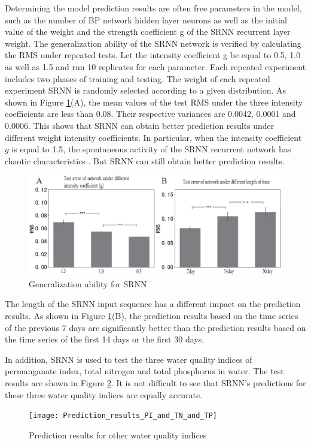 \documentclass[runningheads]{llncs}
\begin{document}
Determining the model prediction results are often free parameters in the model, 
such as the number of BP network hidden layer neurons as well as the initial
value of the weight and the strength coefficient g of the SRNN recurrent 
layer weight. The generalization ability of the SRNN network is verified
by calculating the RMS under repeated tests. 
Let the intensity coefficient g be equal to 0.5, 1.0 as well as 1.5 and run 10 
replicates for each parameter. Each repeated experiment includes two
phases of training and testing. The weight of each repeated experiment 
SRNN is randomly selected according to a given distribution. 
As shown in Figure \ref{Generalization ability for SRNN}(A), the mean values of the test
RMS under the three intensity coefficients are less 
than 0.08. Their respective variances are 0.0042, 0.0001 and 0.0006. This 
shows that SRNN can obtain better prediction results under different weight
intensity coefficients. In particular, when the intensity coefficient
$g$ is equal to 1.5, the spontaneous activity of the SRNN recurrent network has
chaotic characteristics \cite{RN17}. But SRNN can still obtain better prediction results.

\begin{figure}[htbp]
\centering
\includegraphics[width=0.8\columnwidth]{Generalization_for_SRNN}
\caption{Generalization ability for SRNN}
\label{Generalization ability for SRNN}
\end{figure}

The length of the SRNN input sequence has a different impact on the prediction results. 
As shown in Figure \ref{Generalization ability for SRNN}(B), the prediction 
results based on the time series of the 
previous 7 days are significantly better than the prediction results 
based on the time series of the first 14 days or the first 30 days.

In addition, SRNN is used to test the three water quality indices of 
permanganate index, total nitrogen and total phosphorus in water. 
The test results are shown in Figure \ref{Prediction results for other water quality indices}. 
It is not difficult to see that 
SRNN's predictions for these three water quality indices are equally accurate.
\begin{figure}[htbp]
\centering
\texttt{[image: Prediction\_results\_PI\_and\_TN\_and\_TP]}
\caption{Prediction results for other water quality indices}
\label{Prediction results for other water quality indices}
\end{figure}
\end{document}
